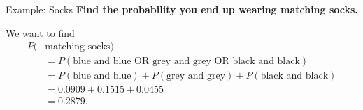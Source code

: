 \begin{frame}{Example: Socks}
    \textbf{Find the probability you end up wearing matching socks.}
    
    \vspace{12pt}We want to find
    \begin{align*}
        P(&\text{matching socks}) \\
        &=P(\text{blue and blue OR grey and grey OR black and black}) \\
        &= P(\text{blue and blue}) + P(\text{grey and grey}) + P(\text{black and black}) \\
        &= 0.0909 + 0.1515 + 0.0455 \\
        &= 0.2879.
    \end{align*}
\end{frame}